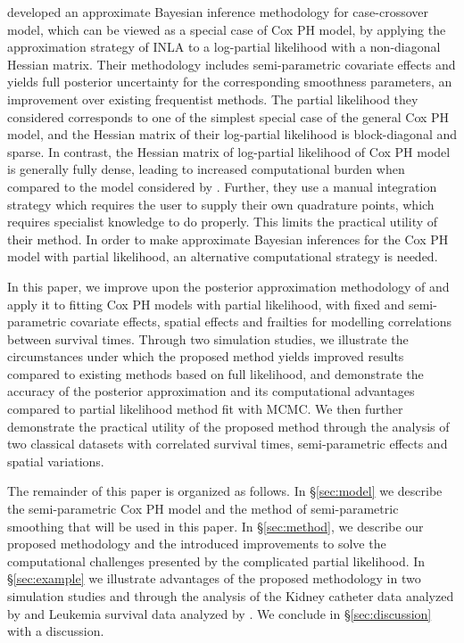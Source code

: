\documentclass[ba]{imsart}
\begin{document}
\cite{casecross} developed an approximate Bayesian inference methodology for case-crossover model, which can be viewed as a special case of Cox PH model, by applying the approximation strategy of INLA to a log-partial likelihood with a non-diagonal Hessian matrix. 
Their methodology includes semi-parametric covariate effects and yields full posterior uncertainty for the corresponding smoothness parameters, an improvement over existing frequentist methods. The partial likelihood they considered corresponds to one of the simplest special case of the general Cox PH model, and the Hessian matrix of their log-partial likelihood is block-diagonal and sparse. In contrast, the Hessian matrix of log-partial likelihood of Cox PH model is generally fully dense, leading to increased computational burden when compared to the model considered by \cite{casecross}. Further, they use a manual integration strategy which requires the user to supply their own quadrature points, which requires specialist knowledge to do properly. This limits the practical utility of their method. In order to make approximate Bayesian inferences for the Cox PH model with partial likelihood, an alternative computational strategy is needed.



In this paper, we improve upon the posterior approximation methodology of \cite{casecross} and apply it to fitting Cox PH models with partial likelihood, with fixed and semi-parametric covariate effects, spatial effects and frailties for modelling correlations between survival times. Through two simulation studies, we illustrate the circumstances under which the proposed method yields improved results compared to existing methods based on full likelihood, and demonstrate the accuracy of the posterior approximation and its computational advantages compared to partial likelihood method fit with MCMC. We then further demonstrate the practical utility of the proposed method through the analysis of two classical datasets with correlated survival times, semi-parametric effects and spatial variations. 


The remainder of this paper is organized as follows. In \S\ref{sec:model} we describe the semi-parametric Cox PH model and the method of semi-parametric smoothing that will be used in this paper. In \S\ref{sec:method}, we describe our proposed methodology and the introduced improvements to solve the computational challenges presented by the complicated partial likelihood. In \S\ref{sec:example} we illustrate advantages of the proposed methodology in two simulation studies and through the analysis of the Kidney catheter data analyzed by \cite{kidney} and Leukemia survival data analyzed by \cite{inlacoxph}. We conclude in \S\ref{sec:discussion} with a discussion.
\end{document}
